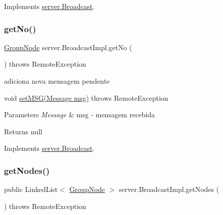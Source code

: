 Implements \hyperlink{interfaceserver_1_1_broadcast_ada7537c3ca6e9d8361c7194b2a3b6e7d}{server.\+Broadcast}.

\mbox{\label{classserver_1_1_broadcast_impl_a7e004ba2fd22f9225c278f1b5bbe4dbb}} 
\subsubsection{\texorpdfstring{get\+No()}{getNo()}}
{\footnotesize\ttfamily \hyperlink{classstructure_1_1_group_node}{Group\+Node} server.\+Broadcast\+Impl.\+get\+No (\begin{DoxyParamCaption}{ }\end{DoxyParamCaption}) throws Remote\+Exception}



adiciona nova mensagem pendente 

void \hyperlink{classserver_1_1_broadcast_impl_a264c486f39faa2ab66a7d5a2a0c245b1}{set\+M\+S\+G(\+Message msg)} throws Remote\+Exception 
\begin{DoxyParams}{Parameters}
{\em Message} & msg -\/ mensagem recebida \\
\hline
\end{DoxyParams}
\begin{DoxyReturn}{Returns}
null 
\end{DoxyReturn}


Implements \hyperlink{interfaceserver_1_1_broadcast_a16bd97cd54313805b23cb7e2255a66a6}{server.\+Broadcast}.

\mbox{\label{classserver_1_1_broadcast_impl_aa6f1dcfe6e97de483e26a2c0a37688d3}} 
\subsubsection{\texorpdfstring{get\+Nodes()}{getNodes()}}
{\footnotesize\ttfamily public Linked\+List$<$ \hyperlink{classstructure_1_1_group_node}{Group\+Node} $>$ server.\+Broadcast\+Impl.\+get\+Nodes (\begin{DoxyParamCaption}{ }\end{DoxyParamCaption}) throws Remote\+Exception}



